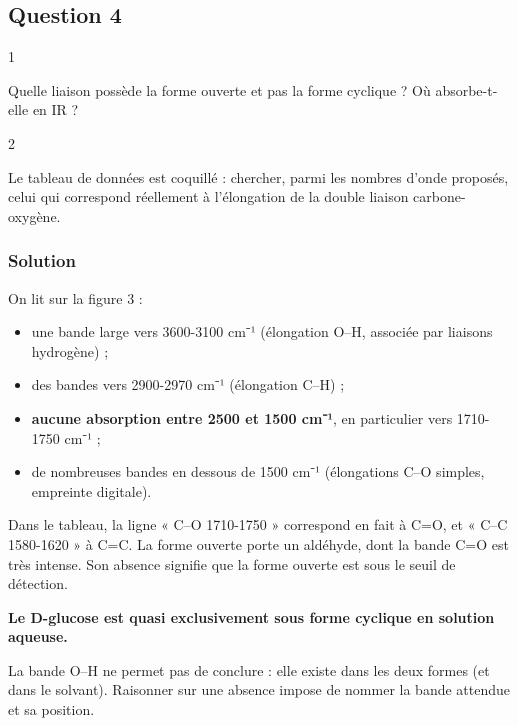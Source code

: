 \documentclass[11pt,a4paper]{article}
\providecommand{\tightlist}{\setlength{\itemsep}{0pt}\setlength{\parskip}{0pt}}
\begin{document}
\hypertarget{question-4}{%
\subsection{Question 4}\label{question-4}}

\begin{indication}{1}

Quelle liaison possède la forme ouverte et pas la forme cyclique ? Où absorbe-t-elle en IR ?

\end{indication}

\begin{indication}{2}

Le tableau de données est coquillé : chercher, parmi les nombres d'onde proposés, celui qui correspond réellement à l'élongation de la double liaison carbone-oxygène.

\end{indication}

\hypertarget{solution-3}{%
\subsubsection{Solution}\label{solution-3}}

On lit sur la figure 3 :

\begin{itemize}
\tightlist
\item
  une bande large vers 3600-3100 cm⁻¹ (élongation O--H, associée par liaisons hydrogène) ;
\item
  des bandes vers 2900-2970 cm⁻¹ (élongation C--H) ;
\item
  \textbf{aucune absorption entre 2500 et 1500 cm⁻¹}, en particulier vers 1710-1750 cm⁻¹ ;
\item
  de nombreuses bandes en dessous de 1500 cm⁻¹ (élongations C--O simples, empreinte digitale).
\end{itemize}

Dans le tableau, la ligne « C--O 1710-1750 » correspond en fait à C=O, et « C--C 1580-1620 » à C=C. La forme ouverte porte un aldéhyde, dont la bande C=O est très intense. Son absence signifie que la forme ouverte est sous le seuil de détection.

\textbf{Le D-glucose est quasi exclusivement sous forme cyclique en solution aqueuse.}

\begin{piege}

La bande O--H ne permet pas de conclure : elle existe dans les deux formes (et dans le solvant). Raisonner sur une absence impose de nommer la bande attendue et sa position.

\end{piege}
\end{document}
